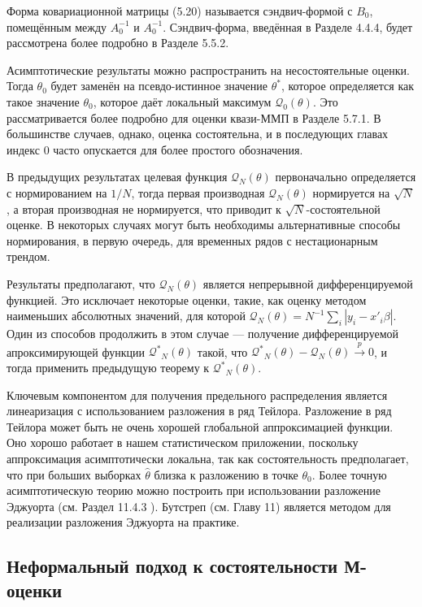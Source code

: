 Форма ковариационной матрицы (5.20) называется сэндвич-формой с $B_0$, помещённым между $A_0^{-1}$ и $A_0^{-1}$. Сэндвич-форма, введённая в Разделе 4.4.4, будет рассмотрена более подробно в Разделе 5.5.2.

Асимптотические результаты можно распространить на несостоятельные оценки. Тогда $\theta_0$ будет заменён на псевдо-истинное значение $\theta^*$, которое определяется как такое значение $\theta_0$, которое даёт локальный максимум $\mathcal{Q}_0(\theta)$. Это рассматривается более подробно для оценки квази-ММП в Разделе 5.7.1. В большинстве случаев, однако, оценка состоятельна, и в последующих главах индекс 0 часто опускается для более простого обозначения.

В предыдущих результатах целевая функция $\mathcal{Q}_N(\theta)$ первоначально определяется с нормированием на $1/N$, тогда первая производная $\mathcal{Q}_N(\theta)$ нормируется на $\sqrt{N}$, а вторая производная не нормируется, что приводит к $\sqrt{N}$-состоятельной оценке. В некоторых случаях могут быть необходимы альтернативные способы нормирования, в первую очередь, для временных рядов с нестационарным трендом.

Результаты предполагают, что $\mathcal{Q}_N(\theta)$ является непрерывной дифференцируемой функцией. Это исключает некоторые оценки, такие, как оценку методом наименьших абсолютных значений, для которой  $\mathcal{Q}_N(\theta)=N^{-1} \sum_i |y_i-x'_i \beta|$. Один из способов продолжить в этом случае --- получение дифференцируемой апроксимирующей функции  $\mathcal{Q^*}_N(\theta)$ такой, что  $\mathcal{Q^*}_N(\theta)-\mathcal{Q}_N(\theta) \xrightarrow{p} 0$, и тогда применить предыдущую теорему к  $\mathcal{Q^*}_N(\theta)$.

Ключевым компонентом для получения предельного распределения является линеаризация с использованием разложения в ряд Тейлора. Разложение в ряд Тейлора может быть не очень хорошей глобальной аппроксимацией функции. Оно хорошо работает в нашем статистическом приложении, поскольку аппроксимация асимптотически локальна, так как состоятельность предполагает, что при больших выборках $\hat{\theta}$ близка к разложению в точке $\theta_0$. Более точную асимптотическую теорию можно построить при использовании разложение Эджуорта (см. Раздел 11.4.3 ). Бутстреп (см. Главу 11) является методом для реализации разложения Эджуорта на практике.

\subsection{Неформальный подход к состоятельности М-оценки}

